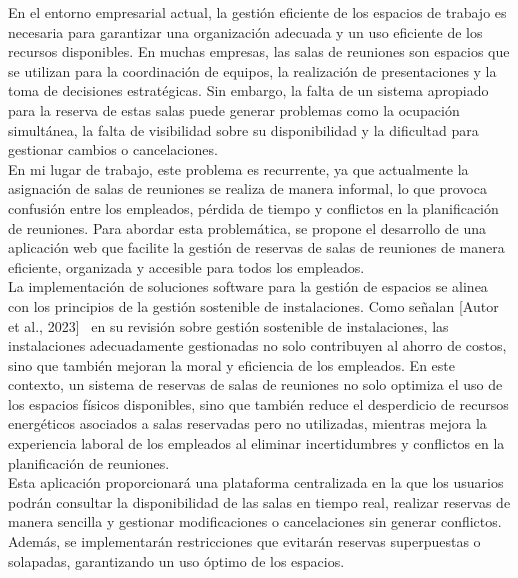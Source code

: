 
En el entorno empresarial actual, la gestión eficiente de los espacios de trabajo es necesaria para garantizar una organización adecuada y un uso eficiente de los recursos disponibles. En muchas empresas, las salas de reuniones son espacios que se utilizan para la coordinación de equipos, la realización de presentaciones y la toma de decisiones estratégicas. Sin embargo, la falta de un sistema apropiado para la reserva de estas salas puede generar problemas como la ocupación simultánea, la falta de visibilidad sobre su disponibilidad y la dificultad para gestionar cambios o cancelaciones.\\

En mi lugar de trabajo, este problema es recurrente, ya que actualmente la asignación de salas de reuniones se realiza de manera informal, lo que provoca confusión entre los empleados, pérdida de tiempo y conflictos en la planificación de reuniones. Para abordar esta problemática, se propone el desarrollo de una aplicación web que facilite la gestión de reservas de salas de reuniones de manera eficiente, organizada y accesible para todos los empleados.\\

La implementación de soluciones software para la gestión de espacios se alinea con los principios de la gestión sostenible de instalaciones. Como señalan [Autor et al., 2023]~\cite{su15043174} en su revisión sobre gestión sostenible de instalaciones, las instalaciones adecuadamente gestionadas no solo contribuyen al ahorro de costos, sino que también mejoran la moral y eficiencia de los empleados. En este contexto, un sistema de reservas de salas de reuniones no solo optimiza el uso de los espacios físicos disponibles, sino que también reduce el desperdicio de recursos energéticos asociados a salas reservadas pero no utilizadas, mientras mejora la experiencia laboral de los empleados al eliminar incertidumbres y conflictos en la planificación de reuniones.\\

Esta aplicación proporcionará una plataforma centralizada en la que los usuarios podrán consultar la disponibilidad de las salas en tiempo real, realizar reservas de manera sencilla y gestionar modificaciones o cancelaciones sin generar conflictos. Además, se implementarán restricciones que evitarán reservas superpuestas o solapadas, garantizando un uso óptimo de los espacios.\\

